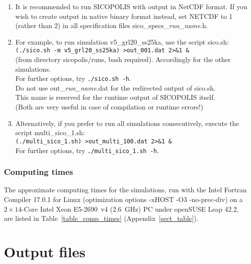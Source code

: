 \documentclass[12pt,a4paper]{article}
\begin{document}
\begin{enumerate}

\item It is recommended to run SICOPOLIS with output in NetCDF format. If you wish to create output in native binary format instead, set NETCDF to 1 (rather than 2) in all specification files sico\_specs\_\emph{run\_name}.h.

\item For example, to run simulation v5\_grl20\_ss25ka, use the script sico.sh:
\\
\hspace*{10mm}\verb+(./sico.sh -m v5_grl20_ss25ka) >out_001.dat 2>&1 &+
\\
(from directory sicopolis/runs, bash required). Accordingly for the other simulations.
\\
For further options, try \verb+./sico.sh -h+.
\\
\warning{} Do not use out\_\emph{run\_name}.dat for the redirected output of sico.sh. 
\\
\phantom{\warning{}} This name is reserved for the runtime output of SICOPOLIS itself.
\\
 (Both are very useful in case of compilation or runtime errors!)

\item Alternatively, if you prefer to run all simulations consecutively, execute the script multi\_sico\_1.sh:
\\
\hspace*{10mm}\verb+(./multi_sico_1.sh) >out_multi_100.dat 2>&1 &+
\\
For further options, try \verb+./multi_sico_1.sh -h+.

\end{enumerate}

\subsubsection*{Computing times}

The approximate computing times for the simulations, run with the Intel Fortran Compiler 17.0.1 for Linux (optimization options -xHOST -O3 -no-prec-div) on a $2\times{}14$-Core Intel Xeon E5-2690~v4 (2.6~GHz) PC under openSUSE Leap 42.2, are listed in Table~\ref{table_comp_times} (Appendix~\ref{sect_table}).

\section{Output files}
\label{sect_output}
\end{document}
